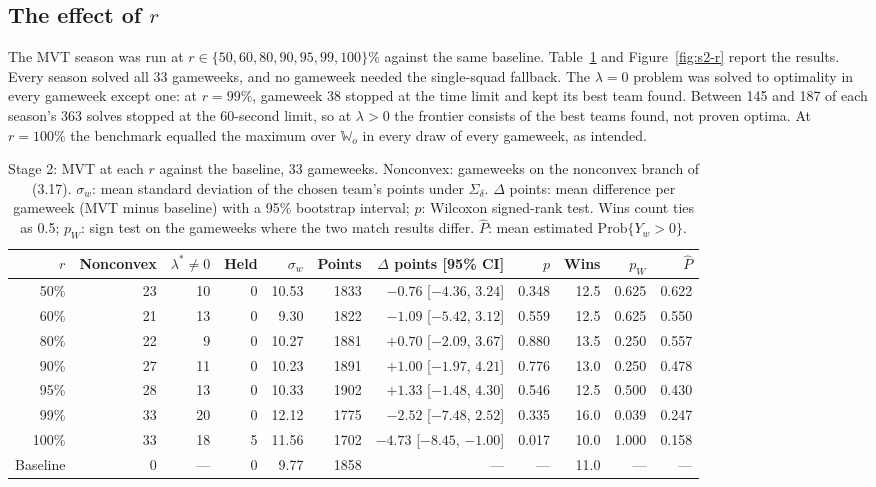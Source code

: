 \documentclass[12pt,oneside,a4paper]{book}
\theoremstyle{definition}
\theoremstyle{remark}
\begin{document}
	\subsection{The effect of $r$}
	\label{sec:s2-r}

	The MVT season was run at $r\in\{50,60,80,90,95,99,100\}\%$ against the same baseline.
	Table~\ref{tab:s2-r} and Figure~\ref{fig:s2-r} report the results. Every season solved all 33
	gameweeks, and no gameweek needed the single-squad fallback. The $\lambda=0$ problem was solved
	to optimality in every gameweek except one: at $r=99\%$, gameweek 38 stopped at the time limit
	and kept its best team found. Between 145 and 187 of each season's 363 solves stopped at the
	60-second limit, so at $\lambda>0$ the frontier consists of the best teams found, not proven
	optima. At $r=100\%$ the benchmark equalled the maximum over $\mathbb{W}_o$ in every draw of
	every gameweek, as intended.

	\begin{table}[ht]
		\centering
		\caption{Stage 2: MVT at each $r$ against the baseline, 33 gameweeks. Nonconvex: gameweeks on
			the nonconvex branch of (3.17). $\sigma_w$: mean standard deviation of the chosen team's points
			under $\Sigma_\delta$. $\Delta$ points: mean difference per gameweek (MVT minus baseline) with a
			95\% bootstrap interval; $p$: Wilcoxon signed-rank test. Wins count ties as 0.5; $p_W$: sign
			test on the gameweeks where the two match results differ. $\hat P$: mean estimated
			$\mathrm{Prob}\{Y_w>0\}$.}
		\label{tab:s2-r}
		\footnotesize
		\setlength{\tabcolsep}{3pt}
		\begin{tabular}{rrrrrrrrrrr}
			\toprule
			$r$ & Nonconvex & $\lambda^*\neq0$ & Held & $\sigma_w$ & Points & $\Delta$ points [95\% CI] & $p$ & Wins & $p_W$ & $\hat P$ \\
			\midrule
			50\%  & 23 & 10 & 0 & 10.53 & 1833 & $-0.76$ [$-4.36$, $3.24$] & 0.348 & 12.5 & 0.625 & 0.622 \\
			60\%  & 21 & 13 & 0 &  9.30 & 1822 & $-1.09$ [$-5.42$, $3.12$] & 0.559 & 12.5 & 0.625 & 0.550 \\
			80\%  & 22 &  9 & 0 & 10.27 & 1881 & $+0.70$ [$-2.09$, $3.67$] & 0.880 & 13.5 & 0.250 & 0.557 \\
			90\%  & 27 & 11 & 0 & 10.23 & 1891 & $+1.00$ [$-1.97$, $4.21$] & 0.776 & 13.0 & 0.250 & 0.478 \\
			95\%  & 28 & 13 & 0 & 10.33 & 1902 & $+1.33$ [$-1.48$, $4.30$] & 0.546 & 12.5 & 0.500 & 0.430 \\
			99\%  & 33 & 20 & 0 & 12.12 & 1775 & $-2.52$ [$-7.48$, $2.52$] & 0.335 & 16.0 & 0.039 & 0.247 \\
			100\% & 33 & 18 & 5 & 11.56 & 1702 & $-4.73$ [$-8.45$, $-1.00$] & 0.017 & 10.0 & 1.000 & 0.158 \\
			\midrule
			Baseline & 0 & --- & 0 & 9.77 & 1858 & --- & --- & 11.0 & --- & --- \\
			\bottomrule
		\end{tabular}
	\end{table}
\end{document}
